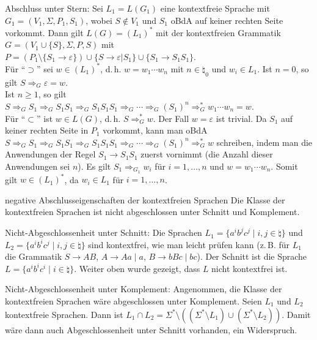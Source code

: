 \begin{Beweis}
    Abschluss unter Stern:
    Sei $L_1 = L(G_1)$ eine kontextfreie Sprache mit
    $G_1 = (V_1, \Sigma, P_1, S_1)$, wobei $S \notin V_1$ und
    $S_1$ oBdA auf keiner rechten Seite vorkommt.
    Dann gilt $L(G) = (L_1)^\ast$ mit der kontextfreien Grammatik
    $G = (V_1 \cup \{S\}, \Sigma, P, S)$ mit\\
    $P = (P_1 \setminus \{S_1 \rightarrow \varepsilon\}) \cup
    \{S \rightarrow \varepsilon | S_1\} \cup \{S_1 \rightarrow S_1 S_1\}$.\\
    Für "`$\supset$"' sei $w \in (L_1)^\ast$, d.\,h.
    $w = w_1 \dotsb w_n$ mit $n \in \natural_0$ und $w_i \in L_1$.
    Ist $n = 0$, so gilt $S \Rightarrow_G \varepsilon = w$.\\
    Ist $n \ge 1$, so gilt $S \Rightarrow_G S_1 \Rightarrow_G S_1 S_1
    \Rightarrow_G S_1 S_1 S_1 \Rightarrow_G \dotsb \Rightarrow_G (S_1)^n
    \Rightarrow_G^\ast w_1 \dotsb w_n = w$.\\
    Für "`$\subset$"' ist $w \in L(G)$, d.\,h. $S \Rightarrow_G^\ast w$.
    Der Fall $w = \varepsilon$ ist trivial.
    Da $S_1$ auf keiner rechten Seite in $P_1$ vorkommt, kann man oBdA
    $S \Rightarrow_G S_1 \Rightarrow_G S_1 S_1
    \Rightarrow_G S_1 S_1 S_1 \Rightarrow_G \dotsb \Rightarrow_G (S_1)^n
    \Rightarrow_G^\ast w$ schreiben, indem man die Anwendungen der Regel
    $S_1 \rightarrow S_1 S_1$ zuerst vornimmt
    (die Anzahl dieser Anwendungen sei $n$).
    Es gilt $S_1 \Rightarrow_{G_1} w_i$ für $i = 1, \dotsc, n$ und
    $w = w_1 \dotsb w_n$.
    Somit gilt $w \in (L_1)^\ast$, da $w_i \in L_1$ für $i = 1, \dotsc, n$.
\end{Beweis}

\linie

\begin{Satz}{negative Abschlusseigenschaften der kontextfreien Sprachen}
    Die Klasse der kontextfreien Sprachen ist nicht abgeschlossen unter
    Schnitt und Komplement.
\end{Satz}

\begin{Beweis}
    Nicht-Abgeschlossenheit unter Schnitt:
    Die Sprachen $L_1 = \{a^i b^j c^j \;|\; i, j \in \natural\}$ und
    $L_2 = \{a^i b^i c^j \;|\; i, j \in \natural\}$ sind kontextfrei,
    wie man leicht prüfen kann
    (z.\,B. für $L_1$ die Grammatik $S \rightarrow AB$,
    $A \rightarrow Aa \;|\; a$, $B \rightarrow bBc \;|\; bc$).
    Der Schnitt ist die Sprache $L = \{a^i b^i c^i \;|\; i \in \natural\}$.
    Weiter oben wurde gezeigt, dass $L$ nicht kontextfrei ist.
    
    Nicht-Abgeschlossenheit unter Komplement:
    Angenommen, die Klasse der kontextfreien Sprachen wäre abgeschlossen
    unter Komplement.
    Seien $L_1$ und $L_2$ kontextfreie Sprachen.
    Dann ist $L_1 \cap L_2 = \Sigma^\ast \setminus
    ((\Sigma^\ast \setminus L_1) \cup (\Sigma^\ast \setminus L_2))$.
    Damit wäre dann auch Abgeschlossenheit unter Schnitt vorhanden,
    ein Widerspruch.
\end{Beweis}

